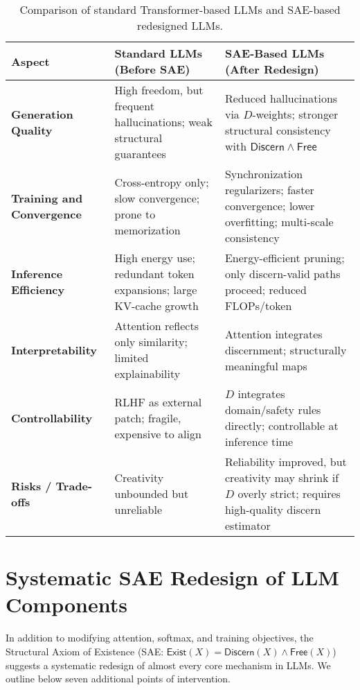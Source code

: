 \documentclass[11pt]{article}
\theoremstyle{plain}
\theoremstyle{definition}
\theoremstyle{remark}
\begin{document}
\begin{table}[h]
\centering
\renewcommand{\arraystretch}{1.3}
\begin{tabular}{p{3.5cm} p{5.5cm} p{5.5cm}}
\toprule
\textbf{Aspect} & \textbf{Standard LLMs (Before SAE)} & \textbf{SAE-Based LLMs (After Redesign)} \\
\midrule
\textbf{Generation Quality} 
& High freedom, but frequent hallucinations; weak structural guarantees 
& Reduced hallucinations via $D$-weights; stronger structural consistency with $\mathsf{Discern} \wedge \mathsf{Free}$ \\

\textbf{Training and Convergence} 
& Cross-entropy only; slow convergence; prone to memorization 
& Synchronization regularizers; faster convergence; lower overfitting; multi-scale consistency \\

\textbf{Inference Efficiency} 
& High energy use; redundant token expansions; large KV-cache growth 
& Energy-efficient pruning; only discern-valid paths proceed; reduced FLOPs/token \\

\textbf{Interpretability} 
& Attention reflects only similarity; limited explainability 
& Attention integrates discernment; structurally meaningful maps \\

\textbf{Controllability} 
& RLHF as external patch; fragile, expensive to align 
& $D$ integrates domain/safety rules directly; controllable at inference time \\

\textbf{Risks / Trade-offs} 
& Creativity unbounded but unreliable 
& Reliability improved, but creativity may shrink if $D$ overly strict; requires high-quality discern estimator \\
\bottomrule
\end{tabular}
\caption{Comparison of standard Transformer-based LLMs and SAE-based redesigned LLMs.}
\end{table}

\newpage
\section{Systematic SAE Redesign of LLM Components}

In addition to modifying attention, softmax, and training objectives, the
Structural Axiom of Existence (SAE: $\mathsf{Exist}(X) = \mathsf{Discern}(X) \wedge \mathsf{Free}(X)$)
suggests a systematic redesign of almost every core mechanism in LLMs.
We outline below seven additional points of intervention.
\end{document}
